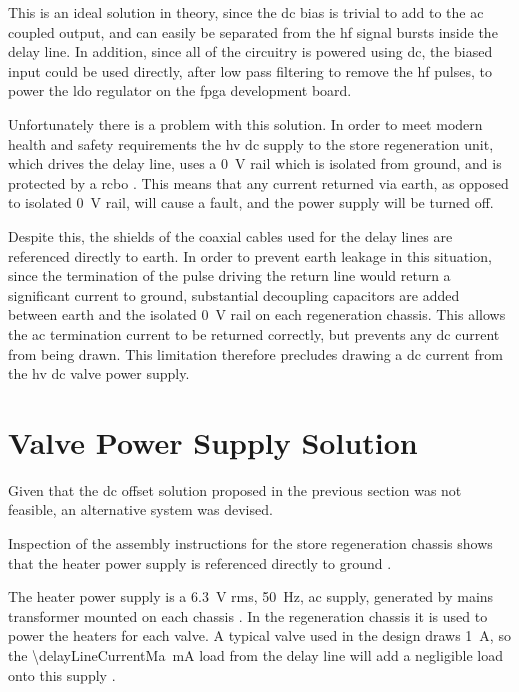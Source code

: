 This is an ideal solution in theory, since the \gls{dc} bias is trivial to add to the \gls{ac} coupled output, and can easily be separated from the \gls{hf} signal bursts inside the delay line. In addition, since all of the circuitry is powered using \gls{dc}, the biased input could be used directly, after low pass filtering to remove the \gls{hf} pulses, to power the \gls{ldo} regulator on the \gls{fpga} development board.

Unfortunately there is a problem with this solution. In order to meet modern health and safety requirements the \gls{hv} \gls{dc} supply to the store regeneration unit, which drives the delay line, uses a \SI{0}{\volt} rail which is isolated from ground, and is protected by a \gls{rcbo} \cite{passmore2015}. This means that any current returned via earth, as opposed to isolated \SI{0}{\volt} rail, will cause a fault, and the power supply will be turned off.

Despite this, the shields of the coaxial cables used for the delay lines are referenced directly to earth. In order to prevent earth leakage in this situation, since the termination of the pulse driving the return line would return a significant current to ground, substantial decoupling capacitors are added between earth and the isolated \SI{0}{\volt} rail on each regeneration chassis. This allows the \gls{ac} termination current to be returned correctly, but prevents any \gls{dc} current from being drawn. This limitation therefore precludes drawing a \gls{dc} current from the \gls{hv} \gls{dc} valve power supply.

\section{Valve Power Supply Solution} \label{sec:power-valve-supply}

Given that the \gls{dc} offset solution proposed in the previous section was not feasible, an alternative system was devised.

Inspection of the assembly instructions for the store regeneration chassis shows that the heater power supply is referenced directly to ground \cite{burton2014a}.

The heater power supply is a \SI{6.3}{\volt} \gls{rms}, \SI{50}{\hertz}, \gls{ac} supply, generated by mains transformer mounted on each chassis \cite[p.1]{mullard} \cite[p.1]{passmore2015}. In the regeneration chassis it is used to power the heaters for each valve. A typical valve used in the design draws \SI{1}{\ampere}, so the \SI{\delayLineCurrentMa}{\milli\ampere} load from the delay line will add a negligible load onto this supply \cite[p.1]{mullard}.

